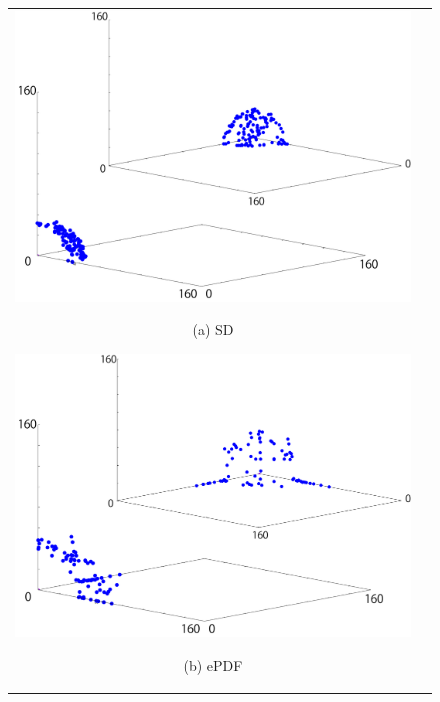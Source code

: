 \documentclass[../main/main]{subfiles}
\begin{document}
\begin{figure}[htbp]
\begin{tabular}{cc}
\begin{minipage}{0.33\hsize}
\includegraphics[width=1\linewidth]{../figures/dtlz3_sd_double.pdf}
\begin{center}
{\footnotesize (a) SD}
\end{center}
\end{minipage}
\begin{minipage}{0.33\hsize}
\includegraphics[width=1\linewidth]{../figures/dtlz3_kde_double.pdf}
\begin{center}
{\footnotesize (b) ePDF}
\end{center}
\end{minipage}
\begin{minipage}{0.33\hsize}

\end{minipage}
\end{tabular}
\end{figure}
\end{document}
